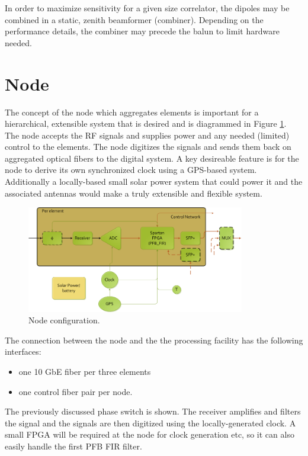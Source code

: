 \documentclass[11pt]{article}
\begin{document}
In order to maximize sensitivity for a given size correlator, the dipoles may be combined in a static, zenith beamformer (combiner).  Depending on the performance details, the combiner may precede the balun to limit hardware needed.

\section{Node}
The concept of the node which aggregates elements is important for a hierarchical, extensible system that is desired and is diagrammed in Figure \ref{fig:node}.  The node accepts the RF signals and supplies power and any needed (limited) control to the elements.  The node digitizes the signals and sends them back on aggregated optical fibers to the digital system.  A key desireable feature is for the node to derive its own synchronized clock using a GPS-based system.  Additionally a locally-based small solar power system that could power it and the associated antennas would make a truly extensible and flexible system.

\begin{figure}[h]
\centering
\includegraphics[width=0.85\textwidth]{Node.png}
\caption{Node configuration.}
\label{fig:node}
\end{figure}

The connection between the node and the the processing facility has the following interfaces:
\begin{itemize}
\item one 10 GbE fiber per three elements
\item one control fiber pair per node.
\end{itemize}

The previously discussed phase switch is shown.  The receiver amplifies and filters the signal and the signals are then digitized using the locally-generated clock.  A small FPGA will be required at the node for clock generation etc, so it can also easily handle the first PFB FIR filter.
\end{document}
